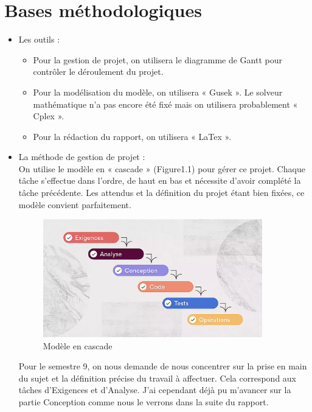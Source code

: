 \documentclass{polytech/polytech}
\numberwithin{figure}{chapter}
\begin{document}
\section{Bases méthodologiques}
\begin{itemize}
\item Les outils : 
\begin{itemize}
    \item Pour la gestion de projet, on utilisera le diagramme de Gantt pour contrôler le déroulement du projet.
    \item Pour la modélisation du modèle, on utilisera « Gusek ». Le solveur mathématique n'a pas encore été fixé mais on utilisera probablement « Cplex ».
    \item Pour la rédaction du rapport, on utilisera « LaTex ».\\
\end{itemize}

\item La méthode de gestion de projet :\\
On utilise le modèle en « cascade » (Figure1.1) pour gérer ce projet. Chaque tâche s'effectue dans l'ordre, de haut en bas et nécessite d'avoir complété la tâche précédente.
Les attendus et la définition du projet étant bien fixées, ce modèle convient parfaitement.\\
\begin{figure}[h!]
    \centering 
    \includegraphics[width=0.9\textwidth]{pic/cascade.png} 
    \caption{Modèle en cascade}
    \label{Modèle en cascade}
\end{figure}

Pour le semestre 9, on nous demande de nous concentrer sur la prise en main du sujet et la définition précise du travail à affectuer. Cela correspond aux tâches d'Exigences et d’Analyse.
J'ai cependant déjà pu m'avancer sur la partie Conception comme nous le verrons dans la suite du rapport.
\end{itemize}
\end{document}
